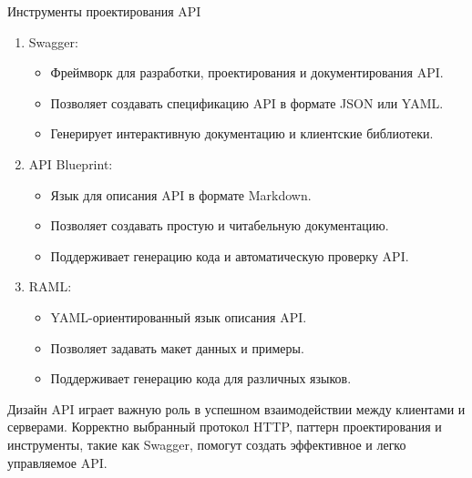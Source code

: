 \documentclass[
  ignorenonframetext,
  aspectratio=169,
  aspectratio=169]{beamer}
\providecommand{\tightlist}{%
  \setlength{\itemsep}{0pt}\setlength{\parskip}{0pt}}
\begin{document}
\begin{frame}{Инструменты проектирования API}
\protect\hypertarget{ux438ux43dux441ux442ux440ux443ux43cux435ux43dux442ux44b-ux43fux440ux43eux435ux43aux442ux438ux440ux43eux432ux430ux43dux438ux44f-api}{}
\begin{enumerate}
\tightlist
\item
  Swagger:

  \begin{itemize}
  \tightlist
  \item
    Фреймворк для разработки, проектирования и документирования API.
  \item
    Позволяет создавать спецификацию API в формате JSON или YAML.
  \item
    Генерирует интерактивную документацию и клиентские библиотеки.
  \end{itemize}
\item
  API Blueprint:

  \begin{itemize}
  \tightlist
  \item
    Язык для описания API в формате Markdown.
  \item
    Позволяет создавать простую и читабельную документацию.
  \item
    Поддерживает генерацию кода и автоматическую проверку API.
  \end{itemize}
\item
  RAML:

  \begin{itemize}
  \tightlist
  \item
    YAML-ориентированный язык описания API.
  \item
    Позволяет задавать макет данных и примеры.
  \item
    Поддерживает генерацию кода для различных языков.
  \end{itemize}
\end{enumerate}

Дизайн API играет важную роль в успешном взаимодействии между клиентами
и серверами. Корректно выбранный протокол HTTP, паттерн проектирования и
инструменты, такие как Swagger, помогут создать эффективное и легко
управляемое API.
\end{frame}
\end{document}
